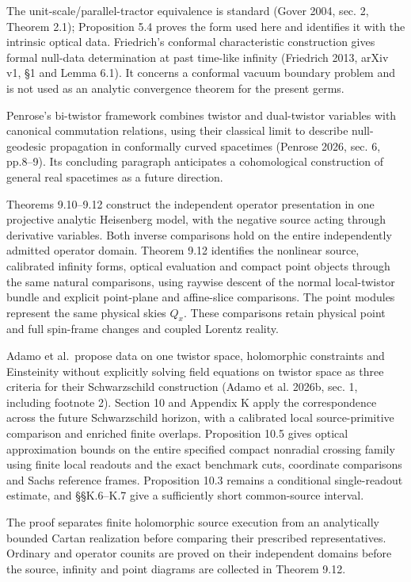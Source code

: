 \documentclass[
  english,
  11pt,
  reqno]{amsart}
\begin{document}
The unit-scale/parallel-tractor equivalence is standard (Gover 2004,
sec. 2, Theorem 2.1); Proposition 5.4 proves the form used here and
identifies it with the intrinsic optical data. Friedrich's conformal
characteristic construction gives formal null-data determination at past
time-like infinity (Friedrich 2013, arXiv v1, §1 and Lemma 6.1). It
concerns a conformal vacuum boundary problem and is not used as an
analytic convergence theorem for the present germs.

Penrose's bi-twistor framework combines twistor and dual-twistor
variables with canonical commutation relations, using their classical
limit to describe null-geodesic propagation in conformally curved
spacetimes (Penrose 2026, sec. 6, pp.8--9). Its concluding paragraph
anticipates a cohomological construction of general real spacetimes as a
future direction.

Theorems 9.10--9.12 construct the independent operator presentation in
one projective analytic Heisenberg model, with the negative source
acting through derivative variables. Both inverse comparisons hold on
the entire independently admitted operator domain. Theorem 9.12
identifies the nonlinear source, calibrated infinity forms, optical
evaluation and compact point objects through the same natural
comparisons, using raywise descent of the normal local-twistor bundle
and explicit point-plane and affine-slice comparisons. The point modules
represent the same physical skies \(Q_x\). These comparisons retain
physical point and full spin-frame changes and coupled Lorentz reality.

Adamo et al.~propose data on one twistor space, holomorphic constraints
and Einsteinity without explicitly solving field equations on twistor
space as three criteria for their Schwarzschild construction (Adamo et
al. 2026b, sec. 1, including footnote 2). Section 10 and Appendix K
apply the correspondence across the future Schwarzschild horizon, with a
calibrated local source-primitive comparison and enriched finite
overlaps. Proposition 10.5 gives optical approximation bounds on the
entire specified compact nonradial crossing family using finite local
readouts and the exact benchmark cuts, coordinate comparisons and Sachs
reference frames. Proposition 10.3 remains a conditional single-readout
estimate, and §§K.6--K.7 give a sufficiently short common-source
interval.

The proof separates finite holomorphic source execution from an
analytically bounded Cartan realization before comparing their
prescribed representatives. Ordinary and operator counits are proved on
their independent domains before the source, infinity and point diagrams
are collected in Theorem 9.12.
\end{document}
